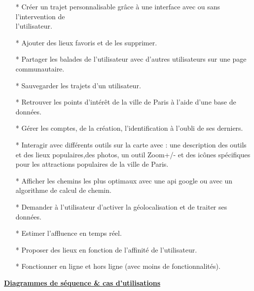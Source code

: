 \documentclass[12pt]{article}
\begin{document}
	\begin{itemize}
		\item[* ] Créer un trajet personnalisable grâce à une interface avec ou sans l’intervention de \\l’utilisateur.
		\item[* ] Ajouter des lieux favoris et de les supprimer.
		\item[* ] Partager les balades de l’utilisateur avec d’autres utilisateurs sur une page communautaire.
		\item[* ] Sauvegarder les trajets d’un utilisateur.
		\item[* ] Retrouver les points d’intérêt de la ville de Paris à l’aide d’une base de données.
		\item[* ] Gérer les comptes, de la création, l’identification à l’oubli de ses derniers.
		\item[* ] Interagir avec différents outils sur la carte avec : une description des outils et des lieux populaires,des photos, un outil Zoom+/- et des icônes spécifiques pour les attractions populaires de la ville de Paris.
		\item[* ] Afficher les chemins les plus optimaux avec une api google ou avec un algorithme de calcul de chemin.
		\item[* ] Demander à l’utilisateur d’activer la géolocalisation et de traiter ses données.
		\item[* ] Estimer l’affluence en temps réel.
		\item[* ] Proposer des lieux en fonction de l’affinité de l’utilisateur.
		\item[* ] Fonctionner en ligne et hors ligne (avec moins de 
		fonctionnalités).
		
		
	\end{itemize}

\textbf{\underline{Diagrammes de séquence \& cas d'utilisations}}
\\
\end{document}
